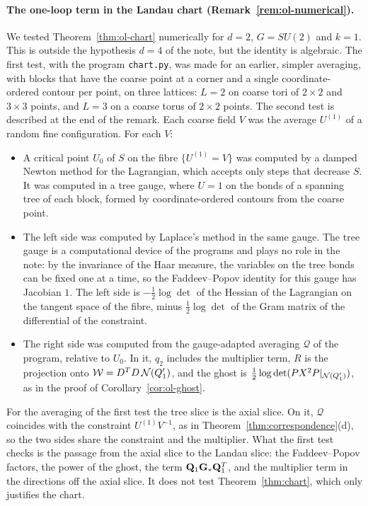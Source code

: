 \paragraph{The one-loop term in the Landau chart (Remark~\ref{rem:ol-numerical}).}
We tested Theorem~\ref{thm:ol-chart} numerically for $d=2$, $G=SU(2)$ and $k=1$. This is outside the hypothesis $d=4$ of the note, but the identity is algebraic. The first test, with the program \texttt{chart.py}, was made for an earlier, simpler averaging, with blocks that have the coarse point at a corner and a single coordinate-ordered contour per point, on three lattices: $L=2$ on coarse tori of $2\times2$ and $3\times3$ points, and $L=3$ on a coarse torus of $2\times2$ points. The second test is described at the end of the remark. Each coarse field $V$ was the average $U^{(1)}$ of a random fine configuration. For each $V$:
\begin{itemize}
\item A critical point $U_0$ of $S$ on the fibre $\{U^{(1)}=V\}$ was computed by a damped Newton method for the Lagrangian, which accepts only steps that decrease $S$. It was computed in a tree gauge, where $U=1$ on the bonds of a spanning tree of each block, formed by coordinate-ordered contours from the coarse point.
\item The left side was computed by Laplace's method in the same gauge. The tree gauge is a computational device of the programs and plays no role in the note: by the invariance of the Haar measure, the variables on the tree bonds can be fixed one at a time, so the Faddeev--Popov identity for this gauge has Jacobian $1$. The left side is $-\frac12\log\det$ of the Hessian of the Lagrangian on the tangent space of the fibre, minus $\frac12\log\det$ of the Gram matrix of the differential of the constraint.
\item The right side was computed from the gauge-adapted averaging $\mathcal Q$ of the program, relative to $U_0$. In it, $q_2$ includes the multiplier term, $R$ is the projection onto $\mathcal W=D^TD\,\mathcal N(Q'_1)$, and the ghost is $\frac12\log\det(PX^2P|_{\mathcal N(Q'_1)})$, as in the proof of Corollary~\ref{cor:ol-ghost}.
\end{itemize}
For the averaging of the first test the tree slice is the axial slice. On it, $\mathcal Q$ coincides with the constraint $U^{(1)}V^{-1}$, as in Theorem~\ref{thm:correspondence}(d), so the two sides share the constraint and the multiplier. What the first test checks is the passage from the axial slice to the Landau slice: the Faddeev--Popov factors, the power of the ghost, the term $\mathbf Q_1\mathbf G_*\mathbf Q_1^T$, and the multiplier term in the directions off the axial slice. It does not test Theorem~\ref{thm:chart}, which only justifies the chart.

